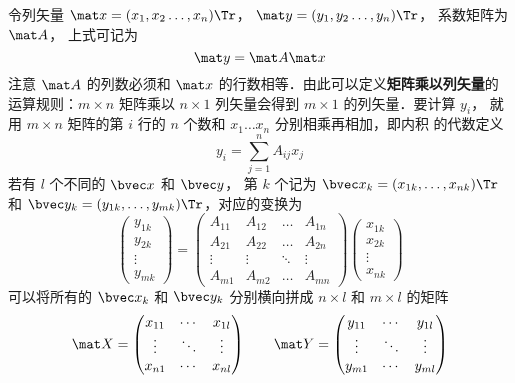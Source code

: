 令列矢量 $\mat x = (x_1,x_2 \dots, x_n)\Tr $，  $\mat y = (y_1,y_2 \dots, y_n)\Tr$， 系数矩阵为 $\mat A$， 上式可记为
\begin{equation}\label{Mat_eq5}
\mat y = \mat A\mat x
\end{equation} 
注意 $\mat A$ 的列数必须和 $\mat x$ 的行数相等．由此可以定义\textbf{矩阵乘以列矢量}的运算规则：$m \times n$ 矩阵乘以 $n \times 1$ 列矢量会得到 $m \times 1$ 的列矢量．要计算 $y_i$， 就用 $m \times n$ 矩阵的第 $i$ 行的 $n$ 个数和 $x_1 \dots x_n$ 分别相乘再相加，即内积 的代数定义
\begin{equation}
y_i = \sum_{j = 1}^n A_{ij} x_j 
\end{equation}
若有 $l$ 个不同的 $\bvec x$ 和 $\bvec y$， 第 $k$ 个记为 $\bvec x_k = (x_{1k},\dots, x_{nk})\Tr$ 和 $\bvec y_k = (y_{1k},\dots, y_{mk})\Tr$，对应的变换为
\begin{equation}
\begin{pmatrix} y_{1k} \\ y_{2k}\\ \vdots \\ y_{mk} \end{pmatrix}
= \begin{pmatrix}
A_{11}  & A_{12} & \ldots & A_{1n} \\
A_{21}  & A_{22} & \ldots & A_{2n} \\
 \vdots & \vdots  & \ddots & \vdots \\
A_{m1}  & A_{m2} & \ldots & A_{mn}
\end{pmatrix}
\begin{pmatrix} x_{1k} \\ x_{2k} \\ \vdots \\ x_{nk} \end{pmatrix}
\end{equation}
可以将所有的 $\bvec x_k$ 和 $\bvec y_k$ 分别横向拼成 $n \times l$ 和 $m \times l$ 的矩阵
\begin{equation}
\mat X =
\begin{pmatrix}
x_{11} & \cdots & x_{1l} \\
 \vdots & \ddots & \vdots \\
x_{n1} & \cdots & x_{nl}
\end{pmatrix}
\qquad
\mat Y =
\begin{pmatrix}
y_{11} & \cdots & y_{1l} \\
 \vdots & \ddots & \vdots \\
y_{m1} & \cdots & y_{ml}
\end{pmatrix}
\end{equation}
